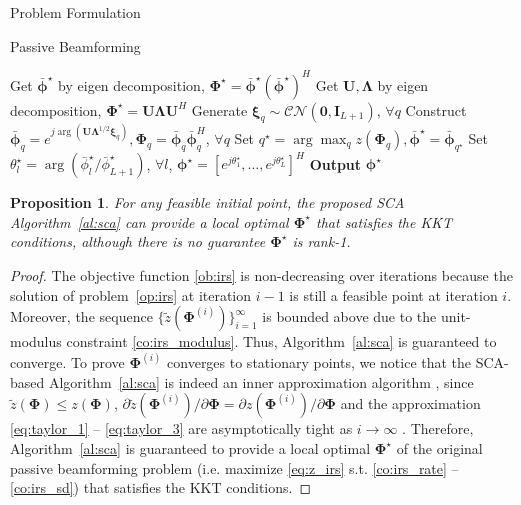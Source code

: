 \documentclass[journal]{IEEEtran}
\newtheorem{proposition}{Proposition}
\begin{document}
\begin{section}{Problem Formulation}
\begin{subsection}{Passive Beamforming}
\begin{algorithm}[!t]
\begin{algorithmic}[1]
						\State Get $\bar{\boldsymbol{\phi}}^\star$ by eigen decomposition, $\boldsymbol{\Phi}^{\star}=\bar{\boldsymbol{\phi}}^\star(\bar{\boldsymbol{\phi}}^\star)^H$
					\Else
						\State Get $\boldsymbol{U},\boldsymbol{\Lambda}$ by eigen decomposition, $\boldsymbol{\Phi}^{\star}=\boldsymbol{U}\boldsymbol{\Lambda}\boldsymbol{U}^H$
						\State Generate $\boldsymbol{\xi}_q \sim \mathcal{CN}(\boldsymbol{0},\boldsymbol{I}_{L+1})$, $\forall q$
						\State Construct $\bar{\boldsymbol{\phi}}_q=e^{j\arg\left(\boldsymbol{U}\boldsymbol{\Lambda}^{1/2}\boldsymbol{\xi}_q\right)},\boldsymbol{\Phi}_q=\bar{\boldsymbol{\phi}}_q\bar{\boldsymbol{\phi}}_q^H$, $\forall q$
						\State Set $q^{\star}=\arg\max_q{z(\boldsymbol{\Phi}_q)},\bar{\boldsymbol{\phi}}^\star=\bar{\boldsymbol{\phi}}_{q^{\star}}$
					\EndIf
					\State Set $\theta_l^\star=\arg(\bar{\phi}_l^\star/\bar{\phi}_{L+1}^\star)$, $\forall l$, $\boldsymbol{\phi}^{\star}=[e^{j\theta_1^\star},\dots,e^{j\theta_L^\star}]^H$
					\State \textbf{Output} $\boldsymbol{\phi}^{\star}$
				\end{algorithmic}
			\end{algorithm}

			\begin{proposition}\label{pr:sca}
				For any feasible initial point, the proposed SCA Algorithm~\ref{al:sca} can provide a local optimal $\boldsymbol{\Phi}^{\star}$ that satisfies the KKT conditions, although there is no guarantee $\boldsymbol{\Phi}^{\star}$ is rank-\num{1}.
			\end{proposition}

			\begin{proof}\label{pf:sca}
				The objective function \eqref{ob:irs} is non-decreasing over iterations because the solution of problem~\eqref{op:irs} at iteration $i-1$ is still a feasible point at iteration $i$. Moreover, the sequence $\{\tilde{z}(\boldsymbol{\Phi}^{(i)})\}_{i=1}^{\infty}$ is bounded above due to the unit-modulus constraint \eqref{co:irs_modulus}. Thus, Algorithm~\ref{al:sca} is guaranteed to converge. To prove $\boldsymbol{\Phi}^{(i)}$ converges to stationary points, we notice that the SCA-based Algorithm~\ref{al:sca} is indeed an inner approximation algorithm \cite{Marks1978}, since $\tilde{z}(\boldsymbol{\Phi}) \le z(\boldsymbol{\Phi})$, $\partial\tilde{z}(\boldsymbol{\Phi}^{(i)})/\partial\boldsymbol{\Phi}=\partial z(\boldsymbol{\Phi}^{(i)})/\partial\boldsymbol{\Phi}$ and the approximation \eqref{eq:taylor_1} -- \eqref{eq:taylor_3} are asymptotically tight as $i \to \infty$ \cite{Li2013}. Therefore, Algorithm~\ref{al:sca} is guaranteed to provide a local optimal $\boldsymbol{\Phi}^{\star}$ of the original passive beamforming problem (i.e. maximize \eqref{eq:z_irs} s.t. \eqref{co:irs_rate} -- \eqref{co:irs_sd}) that satisfies the KKT conditions.
			\end{proof}
		\end{subsection}


\end{section}
\end{document}
